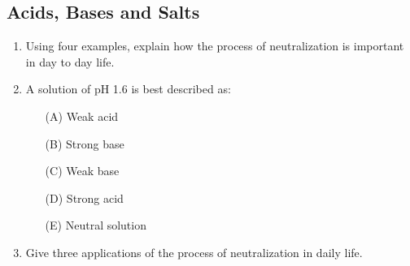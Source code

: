 \subsection{Acids, Bases and Salts}

\begin{enumerate}
	\item Using four examples, explain how the process of neutralization is important in day to day life. 
	
	\item A solution of pH 1.6 is best described as:
	\begin{enumerate}[topsep=0ex,itemsep=0ex,partopsep=1ex,parsep=1ex]
		\item[(A)] Weak acid
		\item[(B)] Strong base
		\item[(C)] Weak base
		\item[(D)] Strong acid
		\item[(E)] Neutral solution
	\end{enumerate}
	
	\item Give three applications of the process of neutralization in daily life.
	
\end{enumerate}








